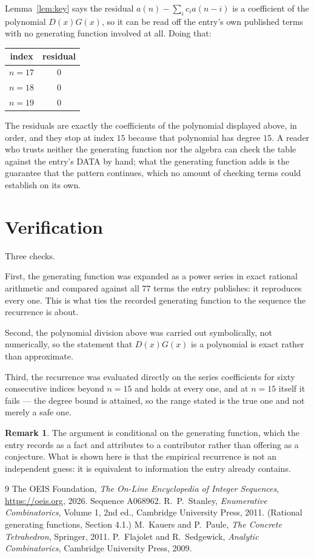 \documentclass[11pt,a4paper]{article}
\theoremstyle{plain}
\theoremstyle{definition}
\newtheorem{remark}[theorem]{Remark}
\begin{document}
Lemma~\ref{lem:key} says the residual $a(n)-\sum_ic_ia(n-i)$ is a coefficient of the
polynomial $D(x)G(x)$, so it can be read off the entry's own published terms with no
generating function involved at all. Doing that:
\begin{center}
\begin{tabular}{cc}
index & residual \\ \hline
$n=17$ & $0$ \\
$n=18$ & $0$ \\
$n=19$ & $0$
\end{tabular}
\end{center}
The residuals are exactly the coefficients of the polynomial displayed above, in order, and
they stop at index $15$ because that polynomial has degree $15$. A reader who trusts
neither the generating function nor the algebra can check the table against the entry's DATA
by hand; what the generating function adds is the guarantee that the pattern continues, which
no amount of checking terms could establish on its own.

\section{Verification}

Three checks.

First, the generating function was expanded as a power series in exact rational arithmetic and
compared against all $77$ terms the entry publishes: it reproduces every one. This is
what ties the recorded generating function to the sequence the recurrence is about.

Second, the polynomial division above was carried out symbolically, not numerically, so the
statement that $D(x)G(x)$ is a polynomial is exact rather than approximate.

Third, the recurrence was evaluated directly on the series coefficients for sixty consecutive
indices beyond $n=15$ and holds at every one, and at $n=15$ itself it fails --- the
degree bound is attained, so the range stated is the true one and not merely a safe one.

\begin{remark}
The argument is conditional on the generating function, which the entry records as a fact and
attributes to a contributor rather than offering as a conjecture. What is shown here is that
the empirical recurrence is not an independent guess: it is equivalent to information the
entry already contains.
\end{remark}

\begin{thebibliography}{9}
 The OEIS Foundation, \emph{The On-Line Encyclopedia of Integer
Sequences}, \url{https://oeis.org}, 2026. Sequence A068962.
 R.~P.~Stanley, \emph{Enumerative Combinatorics}, Volume 1, 2nd ed.,
Cambridge University Press, 2011. (Rational generating functions, Section 4.1.)
 M.~Kauers and P.~Paule, \emph{The Concrete Tetrahedron}, Springer, 2011.
 P.~Flajolet and R.~Sedgewick, \emph{Analytic Combinatorics}, Cambridge
University Press, 2009.
\end{thebibliography}
\end{document}
